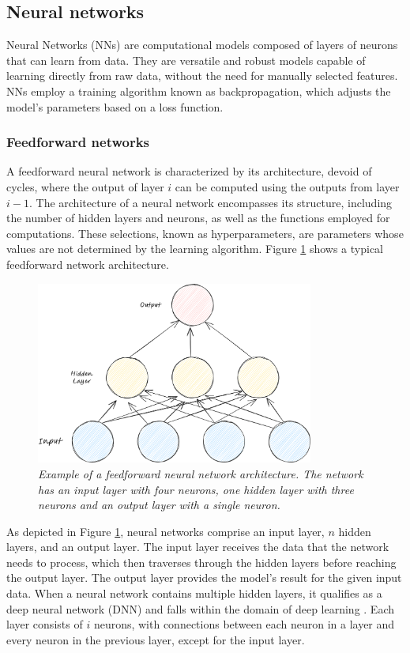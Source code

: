\subsection{Neural networks}

Neural Networks (NNs) are computational models composed of layers of neurons that can learn from data. They are versatile and robust models capable of learning directly from raw data, without the need for manually selected features. NNs employ a training algorithm known as backpropagation, which adjusts the model's parameters based on a loss function.

\subsubsection*{Feedforward networks}

A feedforward neural network is characterized by its architecture, devoid of cycles, where the output of layer \(i\) can be computed using the outputs from layer \(i - 1\). The architecture of a neural network encompasses its structure, including the number of hidden layers and neurons, as well as the functions employed for computations. These selections, known as hyperparameters, are parameters whose values are not determined by the learning algorithm. Figure \ref{fig:ffn} shows a typical feedforward network architecture.


\begin{figure}[H]
    \centering
    \includegraphics[width=\textwidth,height=6cm,keepaspectratio=true]{ffn.png}
    \caption{
        \it{Example of a feedforward neural network architecture. The network has an
            input layer with four neurons, one hidden layer with three neurons and an output layer with a single neuron.}
    }
    \label{fig:ffn}
\end{figure}

As depicted in Figure \ref{fig:ffn}, neural networks comprise an input layer, \(n\) hidden layers, and an output layer. The input layer receives the data that the network needs to process, which then traverses through the hidden layers before reaching the output layer. The output layer provides the model's result for the given input data. When a neural network contains multiple hidden layers, it qualifies as a deep neural network (DNN) and falls within the domain of deep learning \cite{oshea2015introduction}. Each layer consists of \(i\) neurons, with connections between each neuron in a layer and every neuron in the previous layer, except for the input layer.

